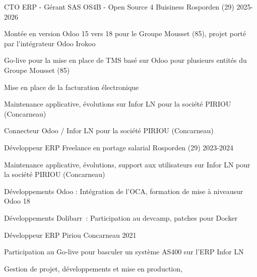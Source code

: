 

\begin{cventries}

  \cventry
    {CTO ERP - Gérant} %
    {SAS OS4B - Open Source 4 Buisiness} %
    {Rosporden (29)} %
    {2025-2026} %
    {
      \begin{cvitems} %
        \item {Montée en version Odoo 15 vers 18 pour le Groupe Mousset (85), projet porté par l'intégrateur Odoo Irokoo}
        \item {Go-live pour la mise en place de TMS basé sur Odoo pour plusieurs entités du Groupe Mousset (85)}
        \item {Mise en place de la facturation électronique}
        \item {Maintenance applicative, évolutions sur Infor LN pour la société PIRIOU (Concarneau)}
        \item {Connecteur Odoo / Infor LN pour la société PIRIOU (Concarneau)}
      \end{cvitems}
    }
  \cventry
    {Développeur ERP} %
    {Freelance en portage salarial} %
    {Rosporden (29)} %
    {2023-2024} %
    {
      \begin{cvitems} %
        \item {Maintenance applicative, évolutions, support aux utilisateurs sur Infor LN pour la société PIRIOU (Concarneau)}
        \item {Développements Odoo : Intégration de l’OCA, formation de mise à niveausur Odoo 18}
        \item {Développements Dolibarr : Participation au devcamp, patches pour Docker}
      \end{cvitems}
    }

  \cventry
    {Développeur ERP} %
    {Piriou} %
    {Concarneau} %
    {2021} %
    {
      \begin{cvitems} %
        \item {Participation au Go-live pour basculer un système AS400 sur l’ERP Infor LN}
        \item {Gestion de projet, développements et mise en production,}
      \end{cvitems}
    }


\end{cventries}
